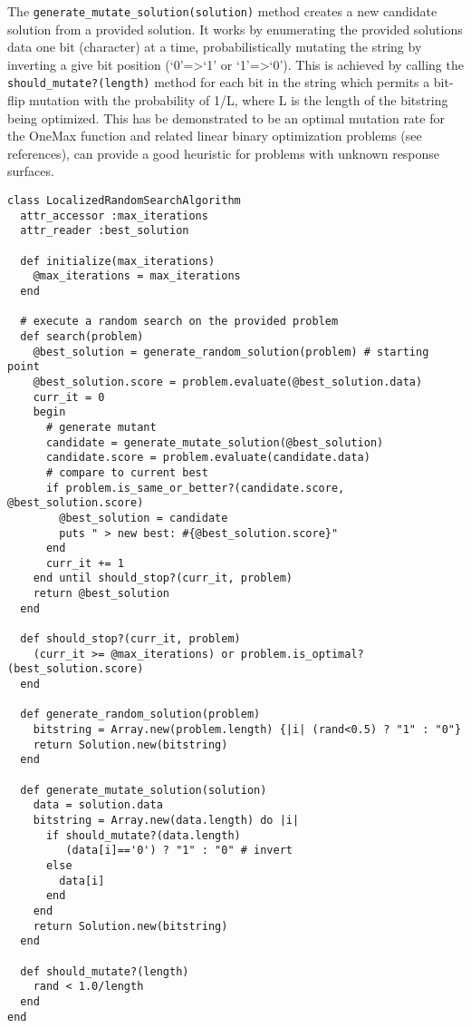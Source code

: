 The \texttt{generate\_mutate\_solution(solution)} method creates a new candidate solution from a provided solution. It works by enumerating the provided solutions data one bit (character) at a time, probabilistically mutating the string by inverting a give bit position (`0'=>`1' or `1'=>`0'). This is achieved by calling the \texttt{should\_mutate?(length)} method for each bit in the string which permits a bit-flip mutation with the probability of 1/L, where L is the length of the bitstring being optimized. This has be demonstrated to be an optimal mutation rate for the OneMax function and related linear binary optimization problems (see references), can provide a good heuristic for problems with unknown response surfaces.

\begin{lstlisting}
class LocalizedRandomSearchAlgorithm
  attr_accessor :max_iterations
  attr_reader :best_solution
  
  def initialize(max_iterations)
    @max_iterations = max_iterations
  end
  
  # execute a random search on the provided problem
  def search(problem)
    @best_solution = generate_random_solution(problem) # starting point
    @best_solution.score = problem.evaluate(@best_solution.data)
    curr_it = 0
    begin
      # generate mutant
      candidate = generate_mutate_solution(@best_solution)
      candidate.score = problem.evaluate(candidate.data)
      # compare to current best
      if problem.is_same_or_better?(candidate.score, @best_solution.score)
        @best_solution = candidate
        puts " > new best: #{@best_solution.score}"    
      end
      curr_it += 1
    end until should_stop?(curr_it, problem)
    return @best_solution
  end
  
  def should_stop?(curr_it, problem)
    (curr_it >= @max_iterations) or problem.is_optimal?(best_solution.score)
  end
  
  def generate_random_solution(problem)
    bitstring = Array.new(problem.length) {|i| (rand<0.5) ? "1" : "0"}
    return Solution.new(bitstring)
  end

  def generate_mutate_solution(solution)
    data = solution.data
    bitstring = Array.new(data.length) do |i| 
      if should_mutate?(data.length)
         (data[i]=='0') ? "1" : "0" # invert
      else
        data[i]
      end
    end
    return Solution.new(bitstring)
  end
  
  def should_mutate?(length)
    rand < 1.0/length
  end
end
\end{lstlisting}

